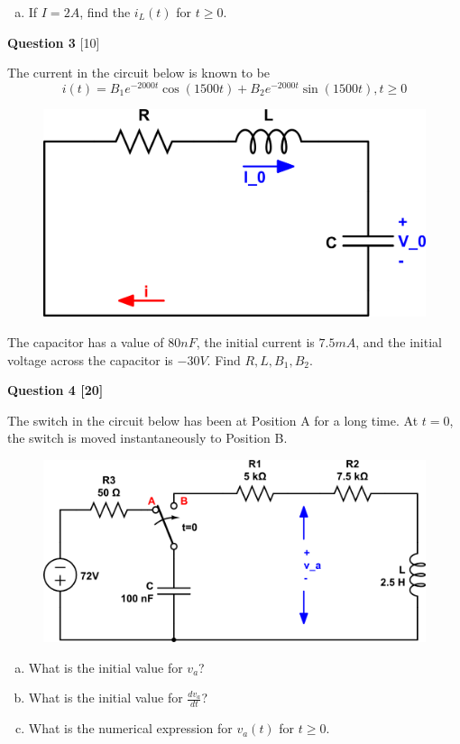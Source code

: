 \documentclass[12pt]{article}
\begin{document}
\begin{enumerate}[(a)]
\item If $ I = 2A$, find the $i_L(t)$ for $t \geq 0$.
\end{enumerate}

\newpage

{\bf Question 3} [10] %

The current in the circuit below is known to be
\begin{equation}
i(t) = B_1 e^{-2000t} \cos{(1500t)} + B_2 e^{-2000t} \sin{(1500t)}, t \geq 0 
\end{equation}
\begin{figure}[h!]
\begin{center}
 \includegraphics[scale=0.4]{fig8_3.png}
\end{center}
\end{figure}

The capacitor has a value of $80 nF$, the initial current is $7.5mA$, and the initial voltage across the capacitor is $-30V$. Find $R, L, B_1, B_2$.

\vspace{0.5cm}

{\bf Question 4 [20]} %

The switch in the circuit below has been at Position A for a long time. At $ t = 0$, the switch is moved instantaneously to Position B. 

\begin{figure}[h!]
\begin{center}
 \includegraphics[scale=0.6]{fig8_46.png}
\end{center}
\end{figure}

\begin{enumerate}[(a)]
\item What is the initial value for $v_a$?
\item What is the initial value for $\frac{dv_a}{dt}$?
\item What is the numerical expression for $v_a(t)$ for $t \geq 0$.
\end{enumerate}
\end{document}
